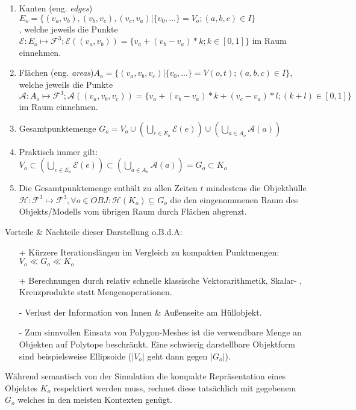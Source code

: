 \begin{enumerate}
\item Kanten (eng. \textit{edges}) $E_o = \{(v_a, v_b), (v_b, v_c),(v_c, v_a) | \{v_0, ...\} = V_o;(a, b, c) \in I\} $\\
, welche jeweils die Punkte $\mathcal{E}:E_o\mapsto\mathcal{F}^3; \mathcal{E}((v_a, v_b)) = \{v_a + (v_b-v_a)* k; k \in [0,1]\} $ im Raum einnehmen.
\item Flächen (eng. \textit{areas})$ A_o = \{(v_a, v_b, v_c) | \{v_0, ... \} = V(o, t); (a, b, c) \in I\} $,\\
welche jeweils die Punkte $\mathcal{A}:A_o\mapsto\mathcal{F}^3; \mathcal{A}((v_a, v_b, v_c)) = \{v_a + (v_b-v_a)* k + (v_c-v_a)*l; (k+l) \in [0,1]\} $ im Raum einnehmen.
\item Gesamtpunktemenge $G_o = V_o \cup (\bigcup_{e\in E_o} \mathcal{E}(e)) \cup (\bigcup_{a\in A_o} \mathcal{A}(a)) $
\item Praktisch immer gilt: $V_o \subset (\bigcup_{e\in E_o} \mathcal{E}(e)) \subset (\bigcup_{a\in A_o} \mathcal{A}(a)) = G_o \subset K_o$
\item Die Gesamtpunktemenge enthält zu allen Zeiten $t$ mindestens die Objekthülle $\mathcal{H}: \mathcal{F}^3 \mapsto \mathcal{F}^3, \forall o\in OBJ: \mathcal{H}(K_o) \subseteq G_o$ die den eingenommenen Raum des Objekts/Modells vom übrigen Raum durch Flächen abgrenzt.
\end{enumerate}

Vorteile \& Nachteile dieser Darstellung o.B.d.A:
\begin{itemize}
\item [+]Kürzere Iterationslängen im Vergleich zu kompakten Punktmengen: $V_o \ll G_o \ll K_o$
\item [+]Berechnungen durch relativ schnelle klassische Vektorarithmetik, Skalar- , Kreuzprodukte statt Mengenoperationen.
\item [-]Verlust der Information von Innen \& Außenseite am Hüllobjekt.
\item [-]Zum sinnvollen Einsatz von Polygon-Meshes ist die verwendbare Menge an Objekten auf Polytope beschränkt. Eine schwierig darstellbare Objektform sind beispielsweise Ellipsoide ($|V_o|$ geht dann gegen $|G_o|$).
\end{itemize}

Während semantisch von der Simulation die kompakte Repräsentation eines Objektes $K_o$ respektiert werden muss, rechnet diese tatsächlich mit gegebenem $G_o$ welches in den meisten Kontexten genügt.

